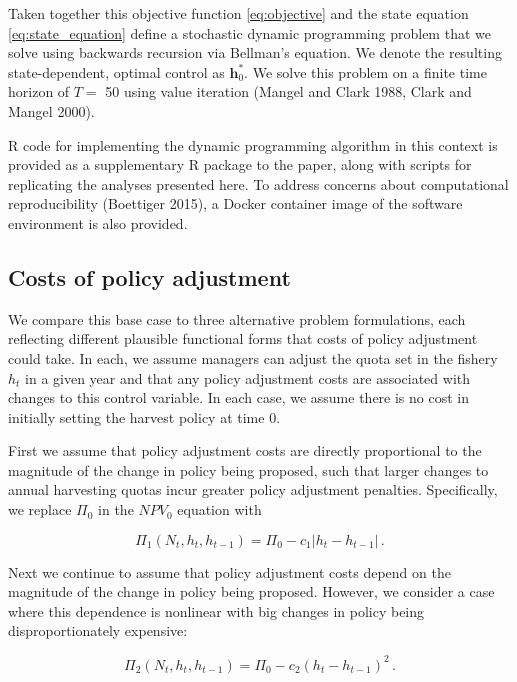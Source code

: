 \documentclass[review,12pt,author-year,titlepage]{components/elsarticle} %
\begin{document}
\begin{flushleft}
Taken together this objective function \eqref{eq:objective} and the
state equation \eqref{eq:state_equation} define a stochastic dynamic
programming problem that we solve using backwards recursion via
Bellman's equation. We denote the resulting state-dependent, optimal
control as \(\mathbf{h}_0^{\ast}\). We solve this problem on a finite
time horizon of \(T =\) 50 using value iteration (Mangel and Clark 1988,
Clark and Mangel 2000).

R code for implementing the dynamic programming algorithm in this
context is provided as a supplementary R package to the paper, along
with scripts for replicating the analyses presented here. To address
concerns about computational reproducibility (Boettiger 2015), a Docker
container image of the software environment is also provided.

\subsection{Costs of policy
adjustment}\label{costs-of-policy-adjustment}

We compare this base case to three alternative problem formulations,
each reflecting different plausible functional forms that costs of
policy adjustment could take. In each, we assume managers can adjust the
quota set in the fishery \(h_t\) in a given year and that any policy
adjustment costs are associated with changes to this control variable.
In each case, we assume there is no cost in initially setting the
harvest policy at time 0.

First we assume that policy adjustment costs are directly proportional
to the magnitude of the change in policy being proposed, such that
larger changes to annual harvesting quotas incur greater policy
adjustment penalties. Specifically, we replace \(\Pi_0\) in the
\(NPV_0\) equation with

\begin{equation}
\Pi_{1}(N_t,h_t, h_{t-1}) = \Pi_0 - c_1  |  h_t - h_{t-1} | \,.
\label{eq:Pi_1}
\end{equation}

Next we continue to assume that policy adjustment costs depend on the
magnitude of the change in policy being proposed. However, we consider a
case where this dependence is nonlinear with big changes in policy being
disproportionately expensive:

\begin{equation}
\Pi_{2}(N_t,h_t, h_{t-1}) = \Pi_0 - c_2 (  h_t - h_{t-1})^2 \,.
\label{eq:Pi_2}
\end{equation}


\end{flushleft}
\end{document}
